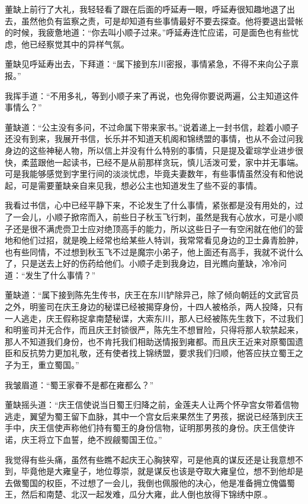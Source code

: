董缺上前行了大礼，我轻轻看了跟在后面的呼延寿一眼，呼延寿很知趣地退了出去，虽然他负有监察之责，可是却知道有些事情最好不要去探查。他将要退出营帐的时候，我疲惫地道：“你去叫小顺子过来。”呼延寿连忙应诺，可是面色也有些忧虑，他已经察觉其中的异样气氛。

董缺见呼延寿出去，下拜道：“属下接到东川密报，事情紧急，不得不来向公子禀报。”

我挥手道：“不用多礼，等到小顺子来了再说，也免得你要说两遍，公主知道这件事情么？”

董缺道：“公主没有多问，不过命属下带来家书。”说着递上一封书信，趁着小顺子还没有到来，我展开书信，长乐并不知道天机阁和锦绣盟的事情，也从不会过问我身边的这些神秘人物，所以信上并没有什么特别的事情，只是提及霍琮学业进步很快，柔蓝跟他一起读书，已经不是从前那样贪玩，慎儿活泼可爱，家中并无事端。可是我能够感觉到字里行间的淡淡忧虑，毕竟夫妻数年，有些事情虽然没有和他说起，可是需要董缺亲自来见我，想必公主也知道发生了些不妥的事情。

我看过书信，心中已经平静下来，不论发生了什么事情，紧张都是没有用处的，过了一会儿，小顺子掀帘而入，前些日子秋玉飞行刺，虽然是我有心放水，可是小顺子还是很不满虎赍卫士应对绝顶高手的能力，所以这些日子一有空闲就在他们的营地和他们过招，就是晚上经常也给某些人特训，我常常看见身边的卫士鼻青脸肿，也有些同情，不过想到秋玉飞不过是魔宗小弟子，他上面还有高手，我就不说什么了，只是送去上好的伤药给他们。小顺子走到我身边，目光瞧向董缺，冷冷问道：“发生了什么事情？”

董缺道：“属下接到陈先生传书，庆王在东川铲除异己，除了倾向朝廷的文武官员之外，明鉴司在庆王身边的秘谍已经被揭穿身份，十四人被格杀，两人投降，只有一人逃走，庆王假称捉拿南楚秘谍，大索东川，那人已经被陈先生救下，不过我们和明鉴司并无合作，而且庆王封锁很严，陈先生不想冒险，只得将那人软禁起来，那人不知道我们身份，也不肯托我们相助送情报到雍都。而且庆王近来对原蜀国遗臣和反抗势力更加礼敬，还有使者找上锦绣盟，要求我们归顺，他答应扶立蜀王之子为王，重立蜀国。”

我皱眉道：“蜀王家眷不是都在雍都么？”

董缺摇头道：“庆王信使说当日蜀王归降之前，金莲夫人让两个怀孕宫女带着信物逃走，翼望为蜀王留下血脉，其中一个宫女后来果然生了男孩，据说已经落到庆王手中，庆王信使声称他们持有蜀王的身份信物，证明那男孩的身份。庆王信使许诺，庆王将立下血誓，绝不觊觎蜀国王位。”

我觉得有些头痛，虽然有些瞧不起庆王心胸狭窄，可是他真的谋反还是让我意想不到，毕竟他是大雍皇子，地位尊崇，就是谋反也该是夺取大雍皇位，想不到他却是去做蜀国的权臣，不过想了一会儿，我倒也佩服他的决心，他是准备拥立傀儡蜀王，然后和南楚、北汉一起发难，瓜分大雍，此人倒也放得下锦绣中原.。


